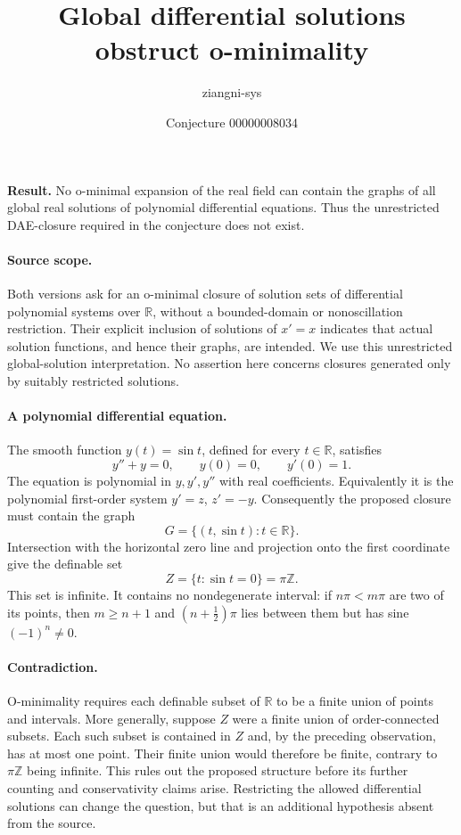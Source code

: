 \documentclass[11pt]{article}
\title{Global differential solutions obstruct o-minimality}
\author{ziangni-sys}
\date{Conjecture 00000008034}
\begin{document}
\raggedright
\maketitle
\noindent\textbf{Result.} No o-minimal expansion of the real field can contain the graphs of all global real solutions of polynomial differential equations. Thus the unrestricted DAE-closure required in the conjecture does not exist.

\paragraph{Source scope.}
Both versions ask for an o-minimal closure of solution sets of differential polynomial systems over $\mathbb R$, without a bounded-domain or nonoscillation restriction. Their explicit inclusion of solutions of $x'=x$ indicates that actual solution functions, and hence their graphs, are intended. We use this unrestricted global-solution interpretation. No assertion here concerns closures generated only by suitably restricted solutions.

\paragraph{A polynomial differential equation.}
The smooth function $y(t)=\sin t$, defined for every $t\in\mathbb R$, satisfies
\[
 y''+y=0,\qquad y(0)=0,\qquad y'(0)=1.
\]
The equation is polynomial in $y,y',y''$ with real coefficients. Equivalently it is the polynomial first-order system $y'=z$, $z'=-y$. Consequently the proposed closure must contain the graph
\[
 G=\{(t,\sin t):t\in\mathbb R\}.
\]
Intersection with the horizontal zero line and projection onto the first coordinate give the definable set
\[
 Z=\{t:\sin t=0\}=\pi\mathbb Z.
\]
This set is infinite. It contains no nondegenerate interval: if $n\pi<m\pi$ are two of its points, then $m\ge n+1$ and $(n+\tfrac12)\pi$ lies between them but has sine $(-1)^n\ne0$.

\paragraph{Contradiction.}
O-minimality requires each definable subset of $\mathbb R$ to be a finite union of points and intervals. More generally, suppose $Z$ were a finite union of order-connected subsets. Each such subset is contained in $Z$ and, by the preceding observation, has at most one point. Their finite union would therefore be finite, contrary to $\pi\mathbb Z$ being infinite. This rules out the proposed structure before its further counting and conservativity claims arise. Restricting the allowed differential solutions can change the question, but that is an additional hypothesis absent from the source.
\end{document}
